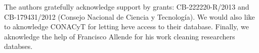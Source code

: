%
%


\begin{acknowledgements}
The authors gratefully acknowledge support by grants:
  CB-222220-R/2013 and CB-179431/2012 (Consejo Nacional de Ciencia y
  Tecnolog\'ia). We would also like to aknowledge CONACyT for letting
  heve access to their database. Finally, we aknowledge the help of Francisco
  Allende for his work cleaning researchers databses.

\end{acknowledgements}


